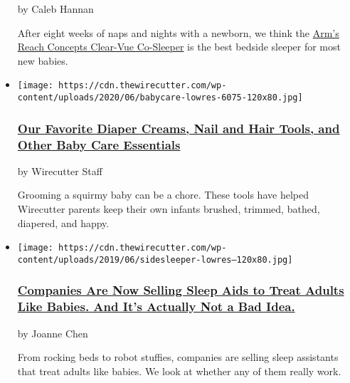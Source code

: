 \begin{itemize}
  by Caleb Hannan

  After eight weeks of naps and nights with a newborn, we think the
  \href{https://www.nytimes3xbfgragh.onion/wirecutter/out/link/7765/163297/4/69539/?merchant=Target}{Arm's
  Reach Concepts Clear-Vue Co-Sleeper} is the best bedside sleeper for
  most new babies.
\item
  \href{https://www.nytimes3xbfgragh.onion/wirecutter/reviews/baby-care-essentials/}{}

  \texttt{[image: https://cdn.thewirecutter.com/wp-content/uploads/2020/06/babycare-lowres-6075-120x80.jpg]}

  \hypertarget{our-favorite-diaper-creams-nail-and-hair-tools-and-other-baby-care-essentials}{%
  \subsubsection{\texorpdfstring{\href{https://www.nytimes3xbfgragh.onion/wirecutter/reviews/baby-care-essentials/}{Our
  Favorite Diaper Creams, Nail and Hair Tools, and Other Baby Care
  Essentials}}{Our Favorite Diaper Creams, Nail and Hair Tools, and Other Baby Care Essentials}}\label{our-favorite-diaper-creams-nail-and-hair-tools-and-other-baby-care-essentials}}

  by Wirecutter Staff

  Grooming a squirmy baby can be a chore. These tools have helped
  Wirecutter parents keep their own infants brushed, trimmed, bathed,
  diapered, and happy.
\item
  \href{https://www.nytimes3xbfgragh.onion/wirecutter/blog/sleep-like-a-baby/}{}

  \texttt{[image: https://cdn.thewirecutter.com/wp-content/uploads/2019/06/sidesleeper-lowres--120x80.jpg]}

  \hypertarget{companies-are-now-selling-sleep-aids-to-treat-adults-like-babies-and-its-actually-not-a-bad-idea}{%
  \subsubsection{\texorpdfstring{\href{https://www.nytimes3xbfgragh.onion/wirecutter/blog/sleep-like-a-baby/}{Companies
  Are Now Selling Sleep Aids to Treat Adults Like Babies. And It's
  Actually Not a Bad
  Idea.}}{Companies Are Now Selling Sleep Aids to Treat Adults Like Babies. And It's Actually Not a Bad Idea.}}\label{companies-are-now-selling-sleep-aids-to-treat-adults-like-babies-and-its-actually-not-a-bad-idea}}

  by Joanne Chen

  From rocking beds to robot stuffies, companies are selling sleep
  assistants that treat adults like babies. We look at whether any of
  them really work.
\end{itemize}

